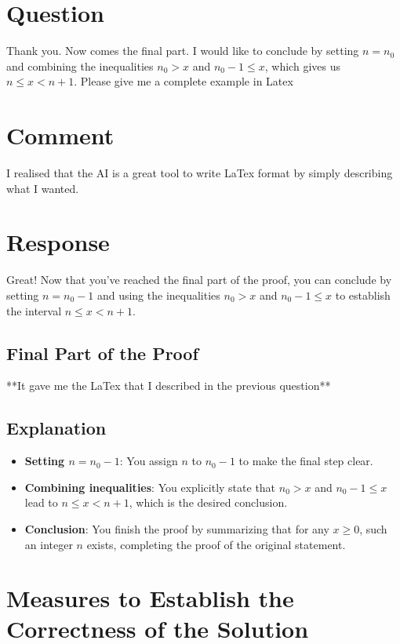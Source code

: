 \documentclass{article}
\begin{document}
\section*{Question}
Thank you. Now comes the final part. I would like to conclude by setting \( n = n_0 \) and combining the inequalities \( n_0 > x \) and \( n_0 - 1 \leq x \), which gives us \( n \leq x < n + 1 \). Please give me a complete example in Latex

\section*{Comment}
I realised that the AI is a great tool to write LaTex format by simply describing what I wanted.

\section*{Response}

Great! Now that you've reached the final part of the proof, you can conclude by setting \( n = n_0 - 1 \) and using the inequalities \( n_0 > x \) and \( n_0 - 1 \leq x \) to establish the interval \( n \leq x < n + 1 \).

\subsection*{Final Part of the Proof}

**It gave me the LaTex that I described in the previous question**

\subsection*{Explanation}

\begin{itemize}
    \item \textbf{Setting \( n = n_0 - 1 \)}: You assign \( n \) to \( n_0 - 1 \) to make the final step clear.
    \item \textbf{Combining inequalities}: You explicitly state that \( n_0 > x \) and \( n_0 - 1 \leq x \) lead to \( n \leq x < n + 1 \), which is the desired conclusion.
    \item \textbf{Conclusion}: You finish the proof by summarizing that for any \( x \geq 0 \), such an integer \( n \) exists, completing the proof of the original statement.
\end{itemize}


\section*{Measures to Establish the Correctness of the Solution}
\end{document}
